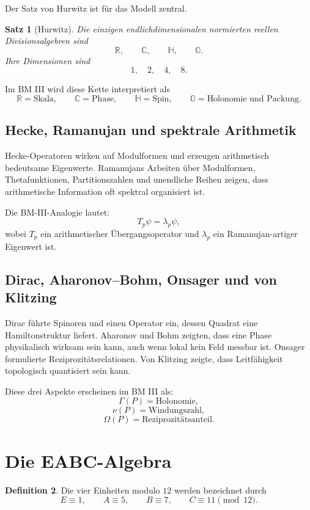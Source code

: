 \documentclass[11pt,a4paper]{article}
\newtheorem{satz}{Satz}[section]
\theoremstyle{definition}
\newtheorem{definition}[satz]{Definition}
\begin{document}
	Der Satz von Hurwitz ist für das Modell zentral.
	
	\begin{satz}[Hurwitz]
		Die einzigen endlichdimensionalen normierten reellen Divisionsalgebren sind
		\[
		\mathbb R,\qquad \mathbb C,\qquad \mathbb H,\qquad \mathbb O.
		\]
		Ihre Dimensionen sind
		\[
		1,\quad 2,\quad 4,\quad 8.
		\]
	\end{satz}
	
	Im BM III wird diese Kette interpretiert als
	\[
	\mathbb R=\text{Skala},\qquad
	\mathbb C=\text{Phase},\qquad
	\mathbb H=\text{Spin},\qquad
	\mathbb O=\text{Holonomie und Packung}.
	\]
	
	\subsection{Hecke, Ramanujan und spektrale Arithmetik}
	
	Hecke-Operatoren wirken auf Modulformen und erzeugen arithmetisch bedeutsame Eigenwerte. Ramanujans Arbeiten über Modulformen, Thetafunktionen, Partitionszahlen und unendliche Reihen zeigen, dass arithmetische Information oft spektral organisiert ist.
	
	Die BM-III-Analogie lautet:
	\[
	T_p\psi=\lambda_p\psi,
	\]
	wobei \(T_p\) ein arithmetischer Übergangsoperator und \(\lambda_p\) ein Ramanujan-artiger Eigenwert ist.
	
	\subsection{Dirac, Aharonov--Bohm, Onsager und von Klitzing}
	
	Dirac führte Spinoren und einen Operator ein, dessen Quadrat eine Hamiltonstruktur liefert. Aharonov und Bohm zeigten, dass eine Phase physikalisch wirksam sein kann, auch wenn lokal kein Feld messbar ist. Onsager formulierte Reziprozitätsrelationen. Von Klitzing zeigte, dass Leitfähigkeit topologisch quantisiert sein kann.
	
	Diese drei Aspekte erscheinen im BM III als:
	\[
	\Gamma(P)=\text{Holonomie},
	\]
	\[
	\nu(P)=\text{Windungszahl},
	\]
	\[
	\Omega(P)=\text{Reziprozitätsanteil}.
	\]
	
	\section{Die EABC-Algebra}
	
	\begin{definition}
		Die vier Einheiten modulo \(12\) werden bezeichnet durch
		\[
		E\equiv1,\qquad A\equiv5,\qquad B\equiv7,\qquad C\equiv11\pmod{12}.
		\]
	\end{definition}
	
\end{document}
